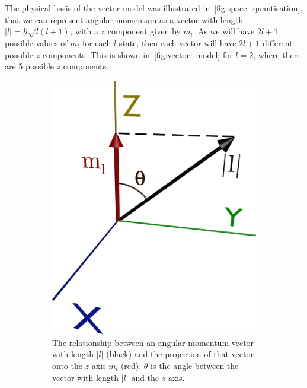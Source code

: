 \documentclass{memoir}[11pt,oneside,a4paper,openany]
\begin{document}
The physical basis of the vector model was illustrated in~\autoref{fig:space_quantisation}, that we can represent angular momentum as a vector with length $\lvert l \rvert = \hbar\sqrt{l(l+1)}$, with a $z$ component given by $m_l$. As we will have $2l+1$ possible values of $m_l$ for each $l$ state, then each vector will have $2l+1$ different possible $z$ components. This is shown in~\autoref{fig:vector_model} for $l=2$, where there are 5 possible $z$ components.  
\begin{figure}[h]
\centering
	\begin{subfigure}[b]{0.35\textwidth}
		\includegraphics[width=\textwidth]{space_quantisation}
		\caption{The relationship between an angular momentum vector with length $\lvert l \rvert$ (black) and the projection of that vector onto the $z$ axis $m_l$ (red). $\theta$ is the angle between the vector with length $\lvert l \rvert$ and the $z$ axis.}\label{fig:space_quantisation}
	\end{subfigure}
	\qquad
	\begin{subfigure}[b]{0.25\textwidth}

\end{subfigure}
\end{figure}
\end{document}
